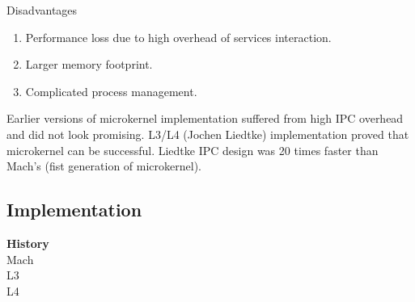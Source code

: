 \documentclass{article}
\begin{document}
    Disadvantages
    \begin{enumerate}[-, leftmargin = 0.7cm, nosep]
    \item Performance loss due to high overhead of services interaction.
    \item Larger memory footprint.  \item Complicated process management.  \end{enumerate}

    Earlier versions of microkernel implementation suffered from high IPC overhead and
    did not look promising. L3/L4 (Jochen Liedtke) implementation proved that microkernel can be successful.
    Liedtke IPC design was 20 times faster than Mach's (fist generation of microkernel).
    
    \subsection{Implementation}
    \textbf{History}\\

    Mach\\

    L3\\

    L4\\
\end{document}
